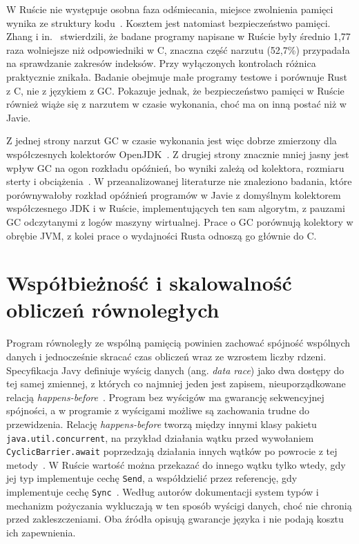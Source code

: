 W Ruście nie występuje osobna faza odśmiecania, miejsce zwolnienia pamięci wynika ze struktury kodu~\cite{klabnik-rustbook}.
Kosztem jest natomiast bezpieczeństwo pamięci.
Zhang i in.~\cite{zhang2022} stwierdzili, że badane programy napisane w Ruście były średnio 1,77 raza wolniejsze niż odpowiedniki w C, znaczna część narzutu (52,7\%) przypadała na sprawdzanie zakresów indeksów.
Przy wyłączonych kontrolach różnica praktycznie znikała.
Badanie obejmuje małe programy testowe i porównuje Rust z C, nie z językiem z GC.
Pokazuje jednak, że bezpieczeństwo pamięci w Ruście również wiąże się z narzutem w czasie wykonania, choć ma on inną postać niż w Javie.

Z jednej strony narzut GC w czasie wykonania jest więc dobrze zmierzony dla współczesnych kolektorów OpenJDK~\cite{cai2022}.
Z drugiej strony znacznie mniej jasny jest wpływ GC na ogon rozkładu opóźnień, bo wyniki zależą od kolektora, rozmiaru sterty i obciążenia~\cite{cai2022,zhao2022}.
W przeanalizowanej literaturze nie znaleziono badania, które porównywałoby rozkład opóźnień programów w Javie z domyślnym kolektorem współczesnego JDK i w Ruście, implementujących ten sam algorytm, z pauzami GC odczytanymi z logów maszyny wirtualnej.
Prace o GC porównują kolektory w obrębie JVM, z kolei prace o wydajności Rusta odnoszą go głównie do C.

\section{Współbieżność i skalowalność obliczeń równoległych}
\label{sec:wspolbieznosc}

Program równoległy ze wspólną pamięcią powinien zachować spójność wspólnych danych i jednocześnie skracać czas obliczeń wraz ze wzrostem liczby rdzeni.
Specyfikacja Javy definiuje wyścig danych (ang. \textit{data race}) jako dwa dostępy do tej samej zmiennej, z których co najmniej jeden jest zapisem, nieuporządkowane relacją \textit{happens-before}~\cite{oracle-jls-25}.
Program bez wyścigów ma gwarancję sekwencyjnej spójności, a w programie z wyścigami możliwe są zachowania trudne do przewidzenia.
Relację \textit{happens-before} tworzą między innymi klasy pakietu \texttt{java.util.concurrent}, na przykład działania wątku przed wywołaniem \texttt{CyclicBarrier.await} poprzedzają działania innych wątków po powrocie z tej metody~\cite{oracle-juc-25}.
W Ruście wartość można przekazać do innego wątku tylko wtedy, gdy jej typ implementuje cechę \texttt{Send}, a współdzielić przez referencję, gdy implementuje cechę \texttt{Sync}~\cite{klabnik-rustbook}.
Według autorów dokumentacji system typów i mechanizm pożyczania wykluczają w ten sposób wyścigi danych, choć nie chronią przed zakleszczeniami.
Oba źródła opisują gwarancje języka i nie podają kosztu ich zapewnienia.


